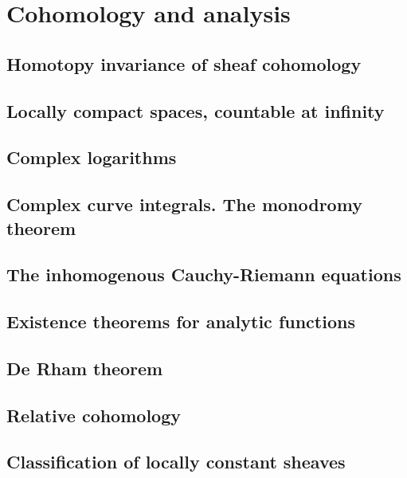 \documentclass[5pt]{article}
\theoremstyle{definition}
\theoremstyle{remark}
\begin{document}
	\newpage
	
	\section{Cohomology and analysis}
	
	\subsection{Homotopy invariance of sheaf cohomology}
	
	\subsection{Locally compact spaces, countable at infinity}
	
	\subsection{Complex logarithms}
	
	\subsection{Complex curve integrals. The monodromy theorem}
	
	\subsection{The inhomogenous Cauchy-Riemann equations}
	
	\subsection{Existence theorems for analytic functions}
	
	\subsection{De Rham theorem}
	
	\subsection{Relative cohomology}
	
	\subsection{Classification of locally constant sheaves}
	
	\newpage
	
\end{document}
